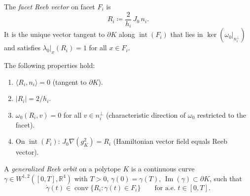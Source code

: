 \begin{definition}\label{def:reeb-vectors}
The \emph{facet Reeb vector} on facet $F_i$ is
\[
  R_i \coloneqq \frac{2}{h_i}\, J_0\, n_i.
\]
It is the unique vector tangent to $\partial K$ along
$\operatorname{int}(F_i)$ that lies in
$\ker(\omega_0|_{n_i^\perp})$ and satisfies
$\lambda_0|_x(R_i) = 1$ for all $x \in F_i$.
\end{definition}

\begin{remark}\label{rem:reeb-properties}
The following properties hold:
\begin{enumerate}
\item $\langle R_i, n_i \rangle = 0$ (tangent to $\partial K$).
\item $|R_i| = 2/h_i$.
\item $\omega_0(R_i, v) = 0$ for all $v \in n_i^\perp$
  (characteristic direction of $\omega_0$ restricted to the facet).
\item On $\operatorname{int}(F_i)$: $J_0 \nabla(g_K^2) = R_i$
  (Hamiltonian vector field equals Reeb vector).
\end{enumerate}
\end{remark}

\begin{definition}\label{def:reeb-orbit-polytope}
A \emph{generalized Reeb orbit} on a polytope $K$ is a continuous curve
$\gamma \in W^{1,2}([0, T], \mathbb{R}^4)$ with $T > 0$,
$\gamma(0) = \gamma(T)$, $\operatorname{Im}(\gamma) \subset \partial K$,
such that
\[
  \dot{\gamma}(t) \in \operatorname{conv}\{ R_i : \gamma(t) \in F_i \}
  \qquad \text{for a.e.\ } t \in [0, T].
\]
\end{definition}


